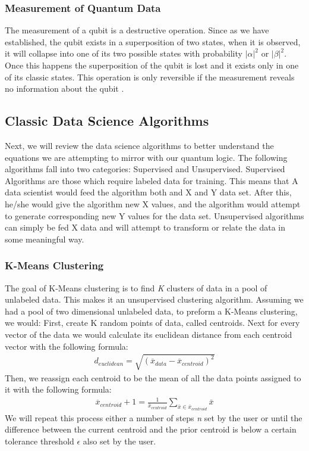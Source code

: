 \documentclass[conference]{IEEEtran}
\begin{document}
\subsubsection{Measurement of Quantum Data}
The measurement of a qubit is a destructive operation. Since as we have established, the qubit exists in a superposition of two states, when it is observed, it will collapse into one of its two possible states with probability $|\alpha|^2$ or $|\beta|^2$. Once this happens the superposition of the qubit is lost and it exists only in one of its classic states. This operation is only reversible if the measurement reveals no information about the qubit \cite{b9}. 

\subsection{Classic Data Science Algorithms}
Next, we will review the data science algorithms to better understand the equations we are attempting to mirror with our quantum logic. The following algorithms fall into two categories: Supervised and Unsupervised. Supervised Algorithms are those which require labeled data for training. This means that A data scientist would feed the algorithm both and X and Y data set. After this, he/she would give the algorithm new X values, and the algorithm would attempt to generate corresponding new Y values for the data set. Unsupervised algorithms can simply be fed X data and will attempt to transform or relate the data in some meaningful way. 
\subsubsection{K-Means Clustering}
The goal of K-Means clustering is to find \emph{K} clusters of data in a pool of unlabeled data. This makes it an unsupervised clustering algorithm. Assuming we had a pool of two dimensional unlabeled data, to preform a K-Means clustering, we would: First, create K random points of data, called centroids. Next for every vector of the data we would calculate its euclidean distance from each centroid vector with the following formula:
\begin{align*}
d_{euclidean} = \sqrt{(\overline{x}_{data} - \overline{x}_{centroid})^2}
\end{align*}
Then, we reassign each centroid to be the mean of all the data points assigned to it with the following formula:
\begin{align*}
\overline{x}_{centroid} + 1 = \frac{1}{\overline{x}_{centroid}}  \sum_{\bar{x}\in\overline{x}_{centroid}} \bar{x}
\end{align*}
We will repeat this process either a number of steps \emph{n} set by the user or until the difference between the current centroid and the prior centroid is below a certain tolerance threshold $\epsilon$ also set by the user\cite{b10}. 
\end{document}
